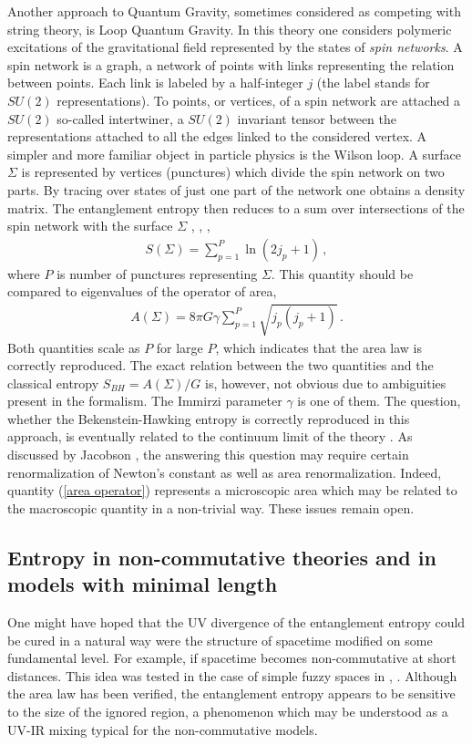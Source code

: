 \documentclass[12pt]{article}
\def\be{\begin{eqnarray}}
\def\ee{\end{eqnarray}}
\def\lb{\label}
\begin{document}
Another approach to Quantum Gravity, sometimes considered as competing with  string theory, is Loop Quantum  Gravity.  In this theory one considers polymeric excitations of the gravitational field represented by the states of {\it spin networks}. A spin network is a graph, a network of points with links representing the relation between points.
Each link is labeled by a half-integer $j$ (the label stands for $SU(2)$ representations). To points, or vertices, of a spin network are attached a $SU(2)$ so-called 
intertwiner, a $SU(2)$ invariant tensor between the representations attached to all the edges linked to the considered vertex. A simpler and more familiar object in particle physics is the Wilson loop.  A surface $\Sigma$ is represented by vertices (punctures) which divide the spin network on two parts.  By tracing over states of just one part of the network one obtains a density matrix. The entanglement entropy then reduces to a sum over intersections of the spin network with the surface $\Sigma$ \cite{Dasgupta:2005yu}, \cite{Livine:2005mw}, \cite{Donnelly:2008vx},
\be
S(\Sigma)=\sum_{p=1}^P\ln (2j_p+1)\, ,
\lb{entropy LQG}
\ee
where $P$ is number of punctures representing $\Sigma$.  This quantity should be compared to eigenvalues of the operator of area,
\be
A(\Sigma)=8\pi G \gamma\sum_{p=1}^P\sqrt{j_p(j_p+1)}\, .
\lb{area operator}
\ee
Both quantities scale as $P$ for large $P$,  which indicates that the area law is correctly reproduced. The exact relation between the two quantities and  the classical entropy
$S_{BH}=A(\Sigma)/G$ is, however, not obvious due to   ambiguities present in the formalism. The Immirzi parameter $\gamma$ is one of them. The question, whether the Bekenstein-Hawking entropy is correctly reproduced in this approach, is eventually related to the continuum limit of the theory \cite{Jacobson:2007uj}. As discussed by Jacobson \cite{Jacobson:2007uj}, the answering this question may require  certain renormalization of Newton's constant as well as area renormalization.  Indeed, quantity (\ref{area operator}) represents a microscopic area
which may be related to the macroscopic quantity in a non-trivial way. These issues remain open.   




\subsection{Entropy in non-commutative theories and in models with minimal length}

One might have hoped that the UV divergence of the entanglement entropy could be  cured  in a natural way were the structure of spacetime  modified on some fundamental level.
For example, if spacetime becomes non-commutative at short distances. This idea was tested in the case of simple fuzzy spaces in \cite{Dou:2006ni}, \cite{Dou:2009cw}. 
Although the area law has been verified, the entanglement entropy appears to be sensitive to the size of the ignored region, a phenomenon which may be understood as a 
UV-IR mixing typical for the non-commutative models. 
\end{document}
